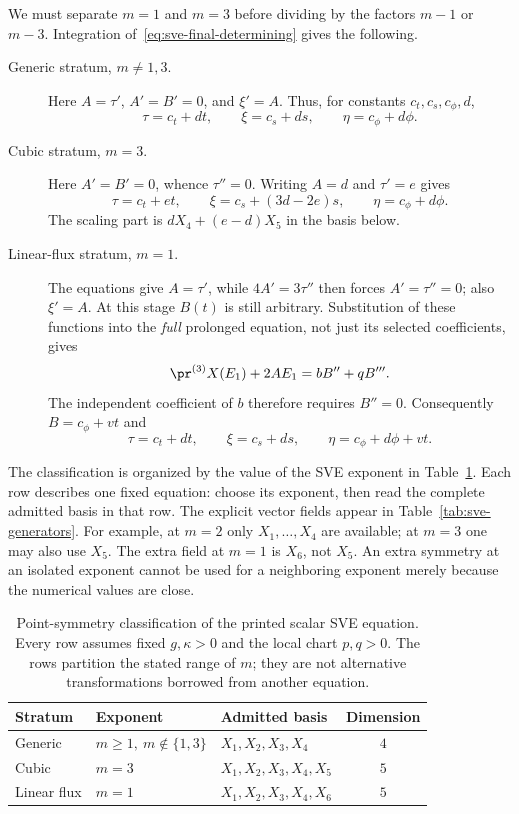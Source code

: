 We must separate $m=1$ and $m=3$ before dividing by the factors $m-1$ or
$m-3$. Integration of~\eqref{eq:sve-final-determining} gives the following.
\begin{description}
\item[Generic stratum, $m\ne1,3$.]
Here $A=\tau'$, $A'=B'=0$, and $\xi'=A$. Thus, for constants
$c_t,c_s,c_\phi,d$,
\[
 \tau=c_t+dt,\qquad \xi=c_s+ds,\qquad \eta=c_\phi+d\phi.
\]
\item[Cubic stratum, $m=3$.]
Here $A'=B'=0$, whence $\tau''=0$. Writing $A=d$ and $\tau'=e$
gives
\[
 \tau=c_t+et,\qquad \xi=c_s+(3d-2e)s,\qquad \eta=c_\phi+d\phi.
\]
The scaling part is $dX_4+(e-d)X_5$ in the basis below.
\item[Linear-flux stratum, $m=1$.]
The equations give $A=\tau'$, while $4A'=3\tau''$ then forces
$A'=\tau''=0$; also $\xi'=A$. At this stage $B(t)$ is still arbitrary.
Substitution of these functions into the \emph{full} prolonged equation,
not just its selected coefficients, gives
\[
 \pr^{(3)}X(E_1)+2A E_1=bB''+qB'''.
\]
The independent coefficient of $b$ therefore requires $B''=0$.
Consequently $B=c_\phi+vt$ and
\[
 \tau=c_t+dt,\qquad \xi=c_s+ds,\qquad
 \eta=c_\phi+d\phi+vt.
\]
\end{description}

The classification is organized by the value of the SVE exponent in
Table~\ref{tab:sve-classification}. Each row describes one fixed equation:
choose its exponent, then read the complete admitted basis in that row.
The explicit vector fields appear in Table~\ref{tab:sve-generators}.
For example, at $m=2$ only $X_1,\ldots,X_4$ are available; at $m=3$
one may also use $X_5$. The extra field at $m=1$ is $X_6$, not $X_5$.
An extra symmetry at an isolated exponent cannot be used for a neighboring
exponent merely because the numerical values are close.

\begin{table}[htbp]
\centering\small
\begin{tabularx}{\linewidth}{@{}llXc@{}}
\toprule
Stratum & Exponent & Admitted basis & Dimension\\
\midrule
Generic & $m\geq1,\ m\notin\{1,3\}$ & $X_1,X_2,X_3,X_4$ & $4$\\
Cubic & $m=3$ & $X_1,X_2,X_3,X_4,X_5$ & $5$\\
Linear flux & $m=1$ & $X_1,X_2,X_3,X_4,X_6$ & $5$\\
\bottomrule
\end{tabularx}
\caption{Point-symmetry classification of the printed scalar SVE equation.
Every row assumes fixed $g,\kappa>0$ and the local chart $p,q>0$.
The rows partition the stated range of $m$; they are not alternative
transformations borrowed from another equation.}
\label{tab:sve-classification}
\end{table}

